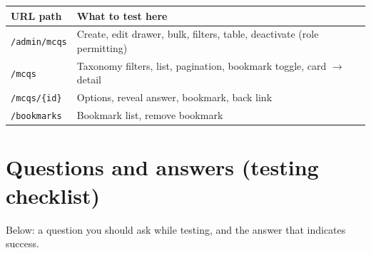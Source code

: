 \documentclass[11pt,a4paper]{article}
\begin{document}
\begin{center}
\begin{tabular}{@{}ll@{}}
\toprule
\textbf{URL path} & \textbf{What to test here} \\
\midrule
\texttt{/admin/mcqs} & Create, edit drawer, bulk, filters, table, deactivate (role permitting) \\
\texttt{/mcqs} & Taxonomy filters, list, pagination, bookmark toggle, card $\rightarrow$ detail \\
\texttt{/mcqs/\{id\}} & Options, reveal answer, bookmark, back link \\
\texttt{/bookmarks} & Bookmark list, remove bookmark \\
\bottomrule
\end{tabular}
\end{center}

\section{Questions and answers (testing checklist)}

Below: a question you should ask while testing, and the answer that indicates success.
\end{document}
